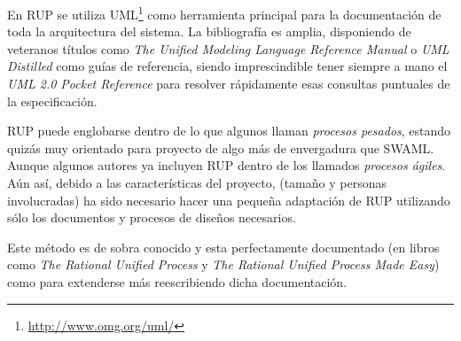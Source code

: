 En RUP se utiliza UML\footnote{\url{http://www.omg.org/uml/}} como herramienta principal
para la documentación de toda la arquitectura del sistema. La bibliografía es amplia,
disponiendo de veteranos títulos como 
\emph{The Unified Modeling Language Reference Manual}\cite{UMLReference} o 
\emph{UML Distilled}\cite{UMLDistilled} como guías de referencia, siendo imprescindible
tener siempre a mano el \emph{UML 2.0 Pocket Reference}\cite{UMLPocket} para resolver
rápidamente esas consultas puntuales de la especificación.

RUP puede englobarse dentro de lo que algunos llaman \emph{procesos pesados},
estando quizás muy orientado para proyecto de algo más de envergadura que SWAML.
Aunque algunos autores\cite{Larman2004} ya incluyen RUP dentro de los llamados 
\emph{procesos ágiles}. Aún así, debido a las características del proyecto, 
(tamaño y personas involucradas) ha sido necesario hacer una pequeña adaptación 
de RUP utilizando sólo los documentos y procesos de diseños necesarios.

Este método es de sobra conocido y esta perfectamente documentado (en libros como
\emph{The Rational Unified Process}\cite{RUPIntro} y
\emph{The Rational Unified Process Made Easy}\cite{RUPEasy}) como para
extenderse más reescribiendo dicha documentación.
